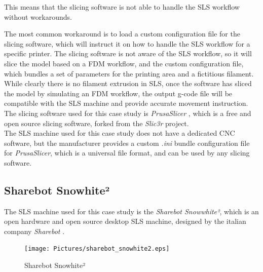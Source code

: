 \documentclass{article}
\begin{document}
        This means that the slicing software is not able to handle the SLS workflow without workarounds. 

        The most common workaround is to load a custom configuration file for the slicing software, 
        which will instruct it on how to handle the SLS workflow for a specific printer. 
        The slicing software is not aware of the SLS workflow, so it will slice the model 
        based on a FDM workflow, and the custom configuration file, which bundles a set of 
        parameters for the printing area and a fictitious filament. \\ 

        While clearly there is no filament extrusion in SLS, once the software has sliced the model by simulating 
        an FDM workflow, the output g-code file will be compatible with the SLS machine and provide 
        accurate movement instruction. \\

        The slicing software used for this case study is \textit{PrusaSlicer} \autocites{PrusaSlicer}, 
        which is a free and open source slicing software, forked from the \textit{Slic3r} project. \\

        The SLS machine used for this case study does not have a dedicated CNC software, but the 
        manufacturer provides a custom \textit{.ini} bundle configuration file for \textit{PrusaSlicer}, which is
        a universal file format, and can be used by any slicing software. \\
        
        
        \clearpage

        \subsection{Sharebot Snowhite²\label{Sharebot_Snowhite²}}

        The SLS machine used for this case study is the \textit{Sharebot Snowwhite²}, which is an open hardware and 
        open source desktop SLS machine, designed by the italian company \textit{Sharebot} \autocites{Sharebot}. \\ 

        \begin{figure}[h!]
            \centering
            \texttt{[image: Pictures/sharebot\_snowhite2.eps]}
            \caption{Sharebot Snowhite²}
            \label{fig:Sharebot_Snowhite2}
        \end{figure}
\end{document}
